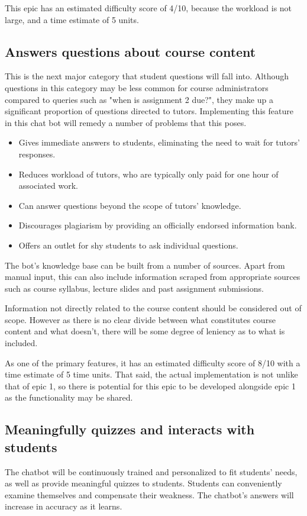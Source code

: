 \documentclass{article}
\begin{document}
This epic has an estimated difficulty score of 4/10, because the workload is not large, and a time estimate of 5 units.


\subsection{Answers questions about course content}
This is the next major category that student questions will fall into. Although questions in this category may be less common for course administrators compared to queries such as "when is assignment 2 due?", they make up a significant proportion of questions directed to tutors. Implementing this feature in this chat bot will remedy a number of problems that this poses.

\begin{itemize}
  \item Gives immediate answers to students, eliminating the need to wait for tutors' responses.
  \item Reduces workload of tutors, who are typically only paid for one hour of associated work.
  \item Can answer questions beyond the scope of tutors' knowledge.
  \item Discourages plagiarism by providing an officially endorsed information bank.
  \item Offers an outlet for shy students to ask individual questions. %
\end{itemize}

The bot's knowledge base can be built from a number of sources. Apart from manual input, this can also include information scraped from appropriate sources such as course syllabus, lecture slides and past assignment submissions.

Information not directly related to the course content should be considered out of scope. However as there is no clear divide between what constitutes course content and what doesn't, there will be some degree of leniency as to what is included.

As one of the primary features, it has an estimated difficulty score of 8/10 with a time estimate of 5 time units. That said, the actual implementation is not unlike that of epic 1, so there is potential for this epic to be developed alongside epic 1 as the functionality may be shared.


\subsection{Meaningfully quizzes and interacts with students}
The chatbot will be continuously trained and personalized to fit students' needs, as well as provide meaningful quizzes to students. Students can conveniently examine themselves and compensate their weakness.%
The chatbot's answers will increase in accuracy as it learns.
\end{document}
